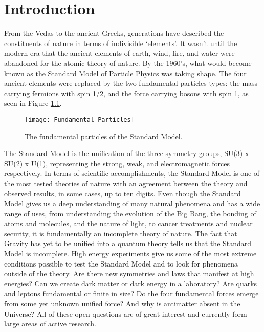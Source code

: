 \chapter{Introduction} \label{ch:introduction}

From the Vedas to the ancient Greeks, generations have described the constituents of nature in terms of indivisible `elements'.  It wasn't until the modern era that the ancient elements of earth, wind, fire, and water were abandoned for the atomic theory of nature.  By the 1960's, what would become known as the Standard Model of Particle Physics was taking shape.  The four ancient elements were replaced by the two fundamental particles types: the mass carrying fermions with spin 1/2, and the force carrying bosons with spin 1, as seen in Figure \ref{fig:fundpart}.


\begin{figure}[h]
\texttt{[image: Fundamental\_Particles]}
\centering
\caption{The fundamental particles of the Standard Model\cite{Patrignani:2016xqp}.}
\label{fig:fundpart}
\end{figure}


\par
The Standard Model is the unification of the three symmetry groups, SU(3) x SU(2) x U(1), representing the strong, weak, and electromagnetic forces respectively\cite{Langacker:2009my}.  In terms of scientific accomplishments, the Standard Model is one of the most tested theories of nature with an agreement between the theory and observed results, in some cases, up to ten digits\cite{Aoyama:2014sxa}.  Even though the Standard Model gives us a deep understanding of many natural phenomena and has a wide range of uses, from understanding the evolution of the Big Bang, the bonding of atoms and molecules, and the nature of light, to cancer treatments and nuclear security, it is fundamentally an incomplete theory of nature.  The fact that Gravity has yet to be unified into a quantum theory tells us that the Standard Model is incomplete.  High energy experiments give us some of the most extreme conditions possible to test the Standard Model and to look for phenomena outside of the theory.  Are there new symmetries and laws that manifest at high energies? Can we create dark matter or dark energy in a laboratory?  Are quarks and leptons fundamental or finite in size?  Do the four fundamental forces emerge from some yet unknown unified force?  And why is antimatter absent in the Universe?  All of these open questions are of great interest and currently form large areas of active research.  

